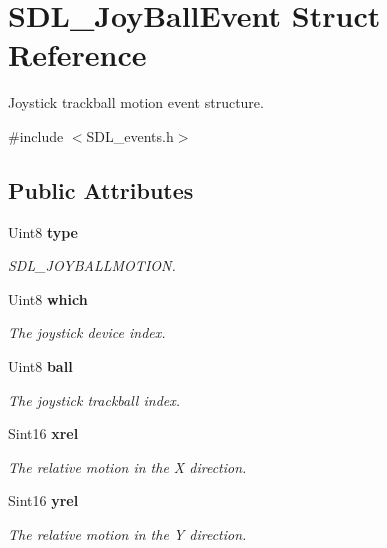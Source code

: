 \section{S\+D\+L\+\_\+\+Joy\+Ball\+Event Struct Reference}
\label{struct_s_d_l___joy_ball_event}


Joystick trackball motion event structure.  




{\ttfamily \#include $<$S\+D\+L\+\_\+events.\+h$>$}

\subsection*{Public Attributes}
\begin{DoxyCompactItemize}
\item 
Uint8 {\bf type}\label{struct_s_d_l___joy_ball_event_aa2c2e84ae1814f280dcc4ec37feb8ce3}

\begin{DoxyCompactList}\small\item\em S\+D\+L\+\_\+\+J\+O\+Y\+B\+A\+L\+L\+M\+O\+T\+I\+O\+N. \end{DoxyCompactList}\item 
Uint8 {\bf which}\label{struct_s_d_l___joy_ball_event_ae23a3dc77c0f327ec3597e68a4fa02ab}

\begin{DoxyCompactList}\small\item\em The joystick device index. \end{DoxyCompactList}\item 
Uint8 {\bf ball}\label{struct_s_d_l___joy_ball_event_add4eb0daeaf95ae56e8c7cfcec560242}

\begin{DoxyCompactList}\small\item\em The joystick trackball index. \end{DoxyCompactList}\item 
Sint16 {\bf xrel}\label{struct_s_d_l___joy_ball_event_a959a8473aa1964e5e1778c27a9ffd261}

\begin{DoxyCompactList}\small\item\em The relative motion in the X direction. \end{DoxyCompactList}\item 
Sint16 {\bf yrel}\label{struct_s_d_l___joy_ball_event_a28ad48a9eb7a5d3ff62ccba09fcead76}

\begin{DoxyCompactList}\small\item\em The relative motion in the Y direction. \end{DoxyCompactList}\end{DoxyCompactItemize}



